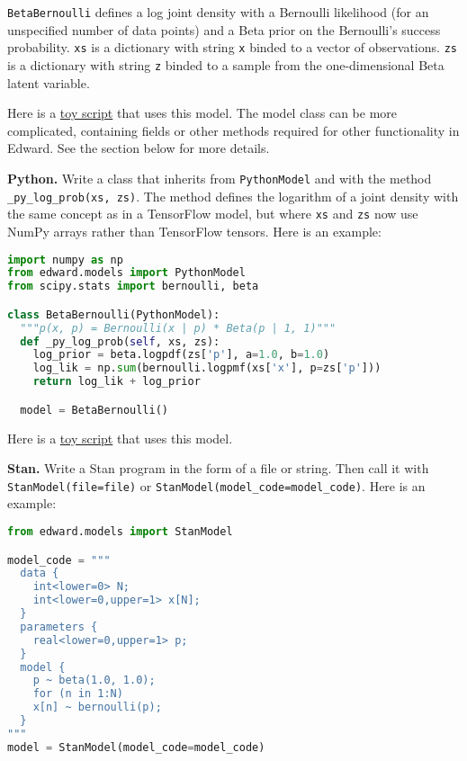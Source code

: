\texttt{BetaBernoulli} defines a log joint density with a Bernoulli
likelihood (for an unspecified number of data points) and a Beta prior
on the Bernoulli's success probability.
\texttt{xs} is a dictionary with string \texttt{x} binded to a vector of
observations. \texttt{zs} is a dictionary with string \texttt{z} binded to a
sample from the one-dimensional Beta latent variable.

Here is a
\href{https://github.com/blei-lab/edward/blob/master/examples/tf_beta_bernoulli.py}
{toy script}
that uses this model. The model class can be more complicated,
containing fields or other methods required for other functionality in
Edward. See the section below for more details.

\textbf{Python.}
Write a class that inherits from \texttt{PythonModel} and with the method
\texttt{_py_log_prob(xs, zs)}. The method defines the logarithm of a joint
density with the same concept as in a TensorFlow model, but where
\texttt{xs} and \texttt{zs} now use NumPy arrays rather than TensorFlow tensors.
Here is an example:

\begin{lstlisting}[language=Python]
import numpy as np
from edward.models import PythonModel
from scipy.stats import bernoulli, beta

class BetaBernoulli(PythonModel):
  """p(x, p) = Bernoulli(x | p) * Beta(p | 1, 1)"""
  def _py_log_prob(self, xs, zs):
    log_prior = beta.logpdf(zs['p'], a=1.0, b=1.0)
    log_lik = np.sum(bernoulli.logpmf(xs['x'], p=zs['p']))
    return log_lik + log_prior

  model = BetaBernoulli()
\end{lstlisting}

Here is a
\href{https://github.com/blei-lab/edward/blob/master/examples/np_beta_bernoulli.py}
{toy script}
that uses this model.

\textbf{Stan.}
Write a Stan program in the form of a file or string. Then
call it with \texttt{StanModel(file=file)} or
\texttt{StanModel(model_code=model_code)}. Here is an example:

\begin{lstlisting}[language=Python]
from edward.models import StanModel

model_code = """
  data {
    int<lower=0> N;
    int<lower=0,upper=1> x[N];
  }
  parameters {
    real<lower=0,upper=1> p;
  }
  model {
    p ~ beta(1.0, 1.0);
    for (n in 1:N)
    x[n] ~ bernoulli(p);
  }
"""
model = StanModel(model_code=model_code)
\end{lstlisting}

